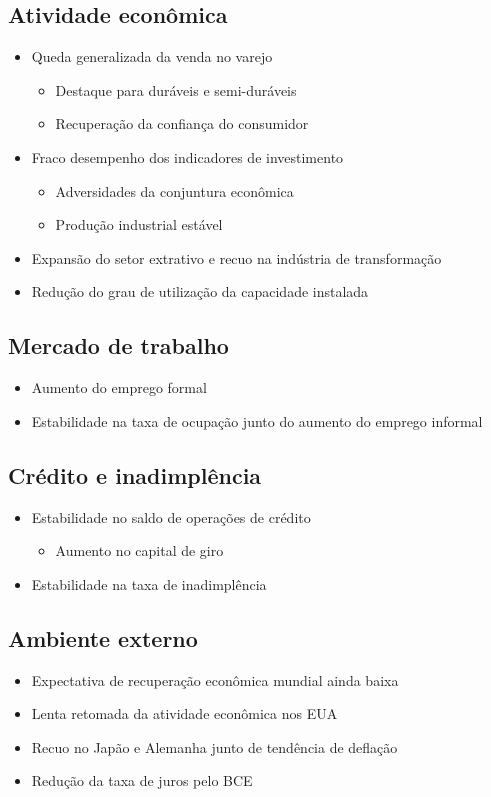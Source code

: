\documentclass[11pt]{article}
\begin{document}
\subsection*{Atividade econômica}
\label{sec:org7dd1082}
\begin{itemize}
\item Queda generalizada da venda no varejo 
\begin{itemize}
\item Destaque para duráveis e semi-duráveis
\item Recuperação da confiança do consumidor
\end{itemize}
\item Fraco desempenho dos indicadores de investimento
\begin{itemize}
\item Adversidades da conjuntura econômica
\item Produção industrial estável
\end{itemize}
\item Expansão do setor extrativo e recuo na indústria de transformação
\item Redução do grau de utilização da capacidade instalada
\end{itemize}
\subsection*{Mercado de trabalho}
\label{sec:org4d6032d}
\begin{itemize}
\item Aumento do emprego formal
\item Estabilidade na taxa de ocupação junto do aumento do emprego informal
\end{itemize}
\subsection*{Crédito e inadimplência}
\label{sec:org4ddd6ac}
\begin{itemize}
\item Estabilidade no saldo de operações de crédito
\begin{itemize}
\item Aumento no capital de giro
\end{itemize}
\item Estabilidade na taxa de inadimplência
\end{itemize}
\subsection*{Ambiente externo}
\label{sec:org1eba5d6}
\begin{itemize}
\item Expectativa de recuperação econômica mundial ainda baixa
\item Lenta retomada da atividade econômica nos EUA
\item Recuo no Japão e Alemanha junto de tendência de deflação
\item Redução da taxa de juros pelo BCE
\end{itemize}
\end{document}
